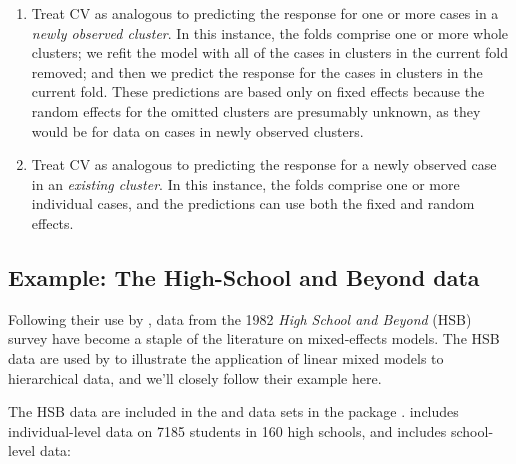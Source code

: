 \documentclass[
]{jss}
\begin{document}
\begin{enumerate}
\def\labelenumi{\arabic{enumi}.}
\item
  Treat CV as analogous to predicting the response for one or more cases
  in a \emph{newly observed cluster}. In this instance, the folds
  comprise one or more whole clusters; we refit the model with all of
  the cases in clusters in the current fold removed; and then we predict
  the response for the cases in clusters in the current fold. These
  predictions are based only on fixed effects because the random effects
  for the omitted clusters are presumably unknown, as they would be for
  data on cases in newly observed clusters.
\item
  Treat CV as analogous to predicting the response for a newly observed
  case in an \emph{existing cluster}. In this instance, the folds
  comprise one or more individual cases, and the predictions can use
  both the fixed and random effects.
\end{enumerate}

\hypertarget{example-the-high-school-and-beyond-data}{%
\subsection{Example: The High-School and Beyond
data}\label{example-the-high-school-and-beyond-data}}

Following their use by \citet{RaudenbushBryk:2002}, data from the 1982
\emph{High School and Beyond} (HSB) survey have become a staple of the
literature on mixed-effects models. The HSB data are used by \citet[Sec.
7.2.2]{FoxWeisberg:2019} to illustrate the application of linear mixed
models to hierarchical data, and we'll closely follow their example
here.

The HSB data are included in the  and
 data sets in the  package
\citep{PinheiroBates:2000}.  includes individual-level
data on 7185 students in 160 high schools, and 
includes school-level data:
\end{document}
